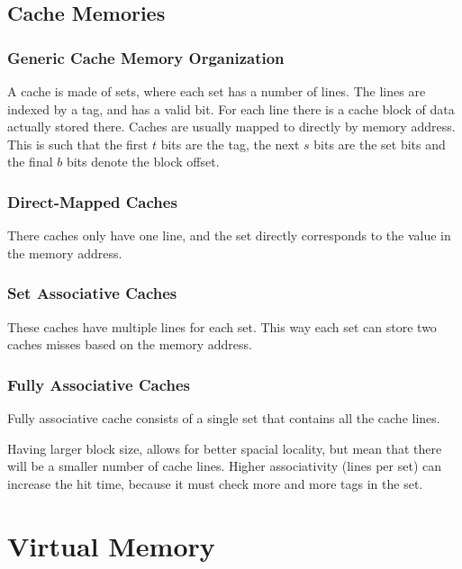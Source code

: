 \documentclass[10pt]{armath}
\begin{document}
\subsection{Cache Memories}%
\label{sub:cache_memories}

\subsubsection{Generic Cache Memory Organization}%
\label{ssub:generic_cache_memory_organization}

A cache is made of sets, where each set has a number of lines. The lines are
indexed by a tag, and has a valid bit. For each line there is a cache block of
data actually stored there. Caches are usually mapped to directly by memory
address. This is such that the first $t$ bits are the tag, the next $s$ bits
are the set bits and the final $b$ bits denote the block offset.

\subsubsection{Direct-Mapped Caches}%
\label{ssub:direct_mapped_caches}

There caches only have one line, and the set directly corresponds to the value
in the memory address.

\subsubsection{Set Associative Caches}%
\label{ssub:set_associative_caches}

These caches have multiple lines for each set. This way each set can store two
caches misses based on the memory address.

\subsubsection{Fully Associative Caches}%
\label{ssub:fully_associative_caches}

Fully associative cache consists of a single set that contains all the cache
lines.

Having larger block size, allows for better spacial locality, but mean that
there will be a smaller number of cache lines. Higher associativity (lines per
set) can increase the hit time, because it must check more and more tags in the
set.

\section{Virtual Memory}%
\label{sec:virtual_memory}
\end{document}
